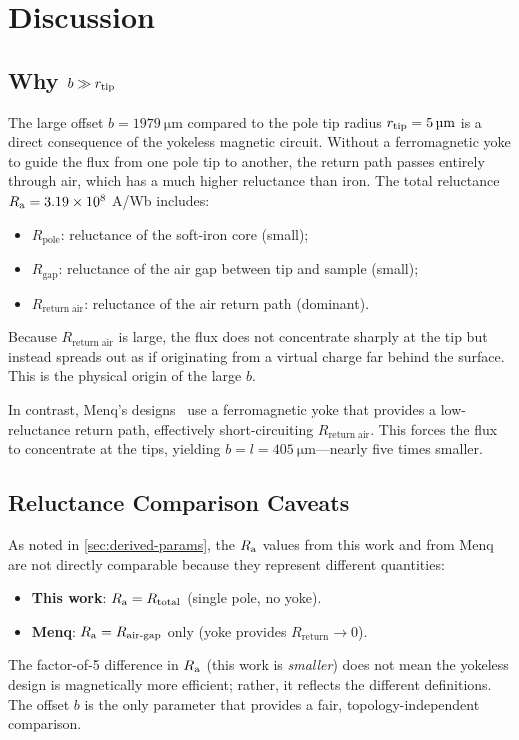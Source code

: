 \section{Discussion}
\label{sec:discussion}

\subsection{Why $b \gg r_\mathrm{tip}$}

The large offset $b = \SI{1979}{\um}$ compared to the pole tip radius
$\rtip = \SI{5}{\um}$ is a direct consequence of the yokeless magnetic
circuit. Without a ferromagnetic yoke to guide the flux from one pole tip
to another, the return path passes entirely through air, which has a much
higher reluctance than iron. The total reluctance
$R_\mathrm{a} = 3.19 \times 10^8$ A/Wb includes:

\begin{itemize}
\item $R_\mathrm{pole}$: reluctance of the soft-iron core (small);
\item $R_\mathrm{gap}$: reluctance of the air gap between tip and sample (small);
\item $R_\mathrm{return\;air}$: reluctance of the air return path (dominant).
\end{itemize}

Because $R_\mathrm{return\;air}$ is large, the flux does not concentrate
sharply at the tip but instead spreads out as if originating from a virtual
charge far behind the surface. This is the physical origin of the large $b$.

In contrast, Menq's designs~\cite{Zhang2010,Menq2011} use a ferromagnetic
yoke that provides a low-reluctance return path, effectively short-circuiting
$R_\mathrm{return\;air}$. This forces the flux to concentrate at the tips,
yielding $b = l = \SI{405}{\um}$---nearly five times smaller.

\subsection{Reluctance Comparison Caveats}

As noted in \cref{sec:derived-params}, the $R_\mathrm{a}$ values from this work and
from Menq are not directly comparable because they represent different
quantities:
\begin{itemize}
\item \textbf{This work}: $R_\mathrm{a} = R_\mathrm{total}$ (single pole, no yoke).
\item \textbf{Menq}: $R_\mathrm{a} = R_\mathrm{air\text{-}gap}$ only (yoke provides
  $R_\mathrm{return} \to 0$).
\end{itemize}
The factor-of-5 difference in $R_\mathrm{a}$ (this work is \emph{smaller}) does not
mean the yokeless design is magnetically more efficient; rather, it reflects
the different definitions. The offset $b$ is the only parameter that provides
a fair, topology-independent comparison.

